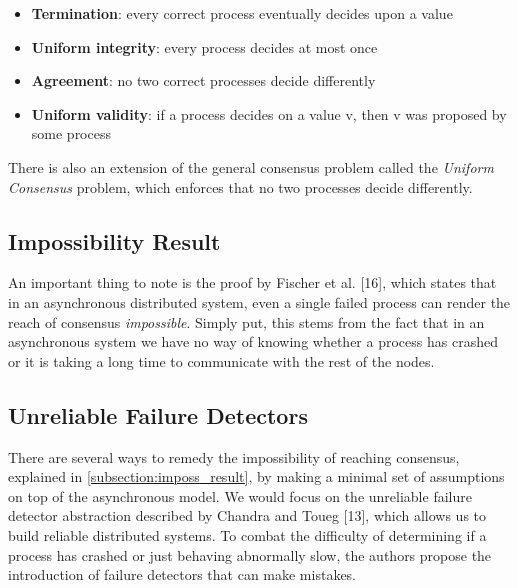 \documentclass[bsc,frontabs,twoside,singlespacing,parskip,deptreport,hidel]{infthesis}     %
\begin{document}
\begin{itemize}
  \item \textbf{Termination}: every correct process eventually decides upon a value
  \item \textbf{Uniform integrity}: every process decides at most once
  \item \textbf{Agreement}: no two correct processes decide differently
  \item \textbf{Uniform validity}: if a process decides on a value v, then v was proposed by some process
\end{itemize}

There is also an extension of the general consensus problem called the \textit{Uniform Consensus} problem, which enforces that no two processes decide differently.

\subsection{Impossibility Result}
\label{subsection:imposs_result}
An important thing to note is the proof by Fischer et al. [16], which states that in an asynchronous distributed system, even a single failed process can render the reach of consensus \textit{impossible}. Simply put, this stems from the fact that in an asynchronous system we have no way of knowing whether a process has crashed or it is taking a long time to communicate with the rest of the nodes.


\subsection{Unreliable Failure Detectors}

There are several ways to remedy the impossibility of reaching consensus, explained in \autoref{subsection:imposs_result}, by making a minimal set of assumptions on top of the asynchronous model. We would focus on the unreliable failure detector abstraction described by Chandra and Toueg [13], which allows us to build reliable distributed systems. To combat the difficulty of determining if a process has crashed or just behaving abnormally slow, the authors propose the introduction of failure detectors that can make mistakes. 
\end{document}
